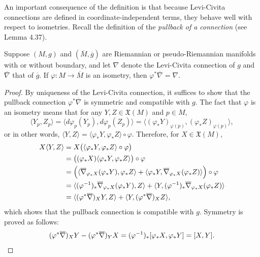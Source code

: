 An important consequence of the definition is that because Levi-Civita connections are defined in coordinate-independent terms, they behave well with respect to isometries. Recall the definition of the \emph{pullback of a connection} (see Lemma 4.37).

\begin{proposition}
\label{prop:naturality-levi-civita}

Suppose $(M,g)$ and $(\overline{M},\overline{g})$ are Riemannian or pseudo-Riemannian manifolds with or without boundary, and let $\nabla$ denote the Levi-Civita connection of $g$ and $\overline{\nabla}$ that of $\overline{g}$. If $\varphi: M \to \overline{M}$ is an isometry, then $\varphi^*\overline{\nabla} = \nabla$.

\begin{proof}
By uniqueness of the Levi-Civita connection, it suffices to show that the pullback connection $\varphi^*\overline{\nabla}$ is symmetric and compatible with $g$. The fact that $\varphi$ is an isometry means that for any $Y,Z \in \mathfrak{X}(M)$ and $p \in M$,
\[
\langle Y_p, Z_p \rangle = \langle d\varphi_p(Y_p), d\varphi_p(Z_p) \rangle = \langle (\varphi_* Y)_{\varphi(p)}, (\varphi_* Z)_{\varphi(p)} \rangle,
\]
or in other words, $\langle Y,Z \rangle = \langle \varphi_* Y, \varphi_* Z \rangle \circ \varphi$. Therefore, for $X \in \mathfrak{X}(M)$,
\begin{align*}
X \langle Y, Z \rangle &= X \bigl(\langle \varphi_* Y, \varphi_* Z \rangle \circ \varphi\bigr) \\
&= \bigl((\varphi_* X) \langle \varphi_* Y, \varphi_* Z \rangle\bigr) \circ \varphi \\
&= \Bigl( \langle \overline{\nabla}_{\varphi_* X}(\varphi_* Y), \varphi_* Z \rangle + \langle \varphi_* Y, \overline{\nabla}_{\varphi_* X}(\varphi_* Z) \rangle \Bigr) \circ \varphi \\
&= \langle (\varphi^{-1})_* \overline{\nabla}_{\varphi_* X}(\varphi_* Y), Z \rangle + \langle Y, (\varphi^{-1})_* \overline{\nabla}_{\varphi_* X}(\varphi_* Z) \rangle \\
&= \langle (\varphi^* \overline{\nabla})_X Y, Z \rangle + \langle Y, (\varphi^* \overline{\nabla})_X Z \rangle,
\end{align*}
which shows that the pullback connection is compatible with $g$. Symmetry is proved as follows:
\[
(\varphi^* \overline{\nabla})_X Y - (\varphi^* \overline{\nabla})_Y X = (\varphi^{-1})_* [\varphi_* X, \varphi_* Y]
= [X,Y]. \qedhere
\]
\end{proof}
\end{proposition}

